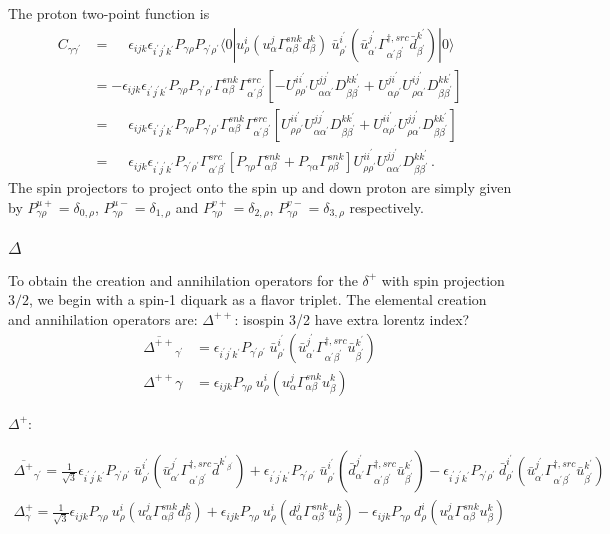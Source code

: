 \documentclass[prd,12pt,superscriptaddress,tightenlines,nofootinbib]{revtex4}
\def\a{{\alpha}}
\def\b{{\beta}}
\def\g{{\gamma}}
\def\G{{\Gamma}}
\def\ip{{i^\prime}}
\def\jp{{j^\prime}}
\def\kp{{k^\prime}}
\def\ap{{\alpha^\prime}}
\def\bp{{\beta^\prime}}
\def\gp{{\gamma^\prime}}
\def\rp{{\rho^\prime}}
\begin{document}
The proton two-point function is
\begin{align}
C_{\g\gp} &= \phantom{-}\epsilon_{ijk} \epsilon_{\ip\jp\kp} P_{\g\rho} P_{\gp\rp} \langle 0| 
	u^i_\rho (u^j_\a \G^{snk}_{\a\b} d^k_\b ) \ \bar{u}^\ip_\rp (\bar{u}^{\jp}_{\ap} \G^{\dagger,src}_{\ap\bp} \bar{d}^\kp_\bp ) 
	|0\rangle
\nonumber\\ &=
	-\epsilon_{ijk} \epsilon_{\ip\jp\kp} P_{\g\rho} P_{\gp\rp} \G^{snk}_{\a\b} \G^{src}_{\ap\bp}
	\left[ -U^{i\ip}_{\rho\rp} U^{j\jp}_{\a\ap} D^{k\kp}_{\b\bp} 
		+ U^{j\ip}_{\a\rp} U^{i\jp}_{\rho\ap} D^{k\kp}_{\b\bp} 
	\right]
\nonumber\\ &=
	\phantom{-}\epsilon_{ijk} \epsilon_{\ip\jp\kp} P_{\g\rho} P_{\gp\rp} \G^{snk}_{\a\b} \G^{src}_{\ap\bp} 
	\left[
		U^{i\ip}_{\rho\rp} U^{j\jp}_{\a\ap} D^{k\kp}_{\b\bp} 
		+U^{i\ip}_{\a\rp} U^{j\jp}_{\rho\ap} D^{k\kp}_{\b\bp} 
	\right]
\nonumber\\ &=
	\phantom{-}\epsilon_{ijk} \epsilon_{\ip\jp\kp}  P_{\gp\rp}  \G^{src}_{\ap\bp} 
	\left[
		P_{\g\rho} \G^{snk}_{\a\b} + P_{\g\a} \G^{snk}_{\rho\b}
	\right]
	U^{i\ip}_{\rho\rp} U^{j\jp}_{\a\ap} D^{k\kp}_{\b\bp} \, .
\end{align}
The spin projectors to project onto the spin up and down proton are simply given by $P^{u+}_{\g\rho} = \delta_{0,\rho}$, $P^{u-}_{\g\rho} = \delta_{1,\rho}$ and $P^{v+}_{\g\rho} = \delta_{2,\rho}$, $P^{v-}_{\g\rho} = \delta_{3,\rho}$ respectively.

\subsubsection*{$\Delta$}
To obtain the creation and annihilation operators for the $\delta^+$ with spin projection 
$3/2$, we begin with a spin-1 diquark as a flavor triplet. The elemental creation and annihilation operators are:
$\Delta^{++}$: 
isospin 3/2 have extra lorentz index?
\begin{align}
	\overline{\Delta^{++}}_{\gp} &= \epsilon_{\ip\jp\kp} P_{\gp\rp}\ \bar{u}^\ip_\rp (\bar{u}^{\jp}_{\ap} \G^{\dagger,src}_{\ap\bp} \bar{u}^\kp_\bp ) 
	\\
	\Delta^{++}{\g} &= \epsilon_{ijk} P_{\g\rho}\ u^i_\rho (u^j_\a \G^{snk}_{\a\b} u^k_\b ) 
\end{align}

$\Delta^{+}$: 

\begin{gather}
\overline{\Delta^{+}}_{\gp} =  \frac{1}{\sqrt{3}}\epsilon_{\ip\jp\kp} P_{\gp\rp}\ \bar{u}^\ip_\rp (\bar{u}^{\jp}_{\ap} \G^{\dagger,src}_{\ap\bp} \bar{d}^{\kp_\bp} ) 
+ \epsilon_{\ip\jp\kp} P_{\gp\rp}\ \bar{u}^\ip_\rp (\bar{d}^{\jp}_{\ap} \G^{\dagger,src}_{\ap\bp} \bar{u}^\kp_\bp ) -
\epsilon_{\ip\jp\kp} P_{\gp\rp}\ \bar{d}^\ip_\rp (\bar{u}^{\jp}_{\ap} \G^{\dagger,src}_{\ap\bp} \bar{u}^\kp_\bp ) 
\\
\Delta^{+}_{\g} = \frac{1}{\sqrt{3}}\epsilon_{ijk} P_{\g\rho}\ u^i_\rho (u^j_\a \G^{snk}_{\a\b} d^k_\b ) +  \epsilon_{ijk} P_{\g\rho}\ u^i_\rho (d^j_\a \G^{snk}_{\a\b} u^k_\b ) - 
\epsilon_{ijk} P_{\g\rho}\ d^i_\rho (u^j_\a \G^{snk}_{\a\b} u^k_\b ) 
\end{gather}
\end{document}
